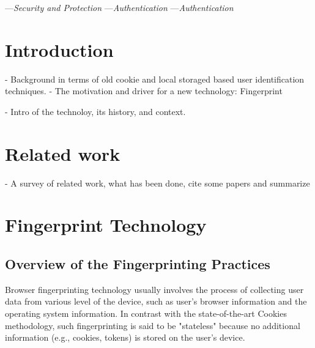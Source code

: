 \documentclass{acm_proc_article-sp}
\begin{document}

---\textit{Security and Protection}
---\textit{Authentication}
---\textit{Authentication}



\section{Introduction}
- Background in terms of old cookie and local storaged based user identification techniques.
- The motivation and driver for a new technology: Fingerprint

- Intro of the technoloy, its history, and context.

\section{Related work}
- A survey of related work, what has been done, cite some papers and summarize 

\section{Fingerprint Technology}

\subsection{Overview of the Fingerprinting Practices}
Browser fingerprinting technology usually involves the process of collecting user data from various level of the device, such as user's browser information and the operating system information. \cite{pierre:beauty}
In contrast with the state-of-the-art Cookies methodology, such fingerprinting is said to be "stateless" because no additional information (e.g., cookies, tokens) is stored on the user's device. 
\end{document}
